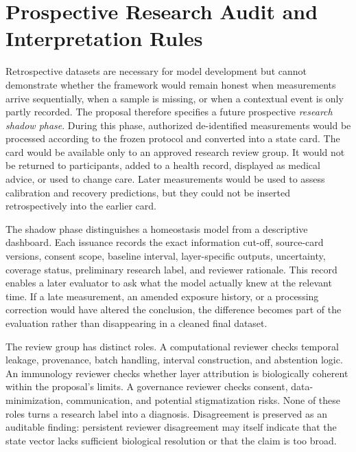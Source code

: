 \documentclass[conference]{IEEEtran}
\begin{document}
\section{Prospective Research Audit and Interpretation Rules}

Retrospective datasets are necessary for model development but cannot demonstrate whether the framework would remain honest when measurements arrive sequentially, when a sample is missing, or when a contextual event is only partly recorded. The proposal therefore specifies a future prospective \emph{research shadow phase}. During this phase, authorized de-identified measurements would be processed according to the frozen protocol and converted into a state card. The card would be available only to an approved research review group. It would not be returned to participants, added to a health record, displayed as medical advice, or used to change care. Later measurements would be used to assess calibration and recovery predictions, but they could not be inserted retrospectively into the earlier card.

The shadow phase distinguishes a homeostasis model from a descriptive dashboard. Each issuance records the exact information cut-off, source-card versions, consent scope, baseline interval, layer-specific outputs, uncertainty, coverage status, preliminary research label, and reviewer rationale. This record enables a later evaluator to ask what the model actually knew at the relevant time. If a late measurement, an amended exposure history, or a processing correction would have altered the conclusion, the difference becomes part of the evaluation rather than disappearing in a cleaned final dataset.

The review group has distinct roles. A computational reviewer checks temporal leakage, provenance, batch handling, interval construction, and abstention logic. An immunology reviewer checks whether layer attribution is biologically coherent within the proposal's limits. A governance reviewer checks consent, data-minimization, communication, and potential stigmatization risks. None of these roles turns a research label into a diagnosis. Disagreement is preserved as an auditable finding: persistent reviewer disagreement may itself indicate that the state vector lacks sufficient biological resolution or that the claim is too broad.
\end{document}
